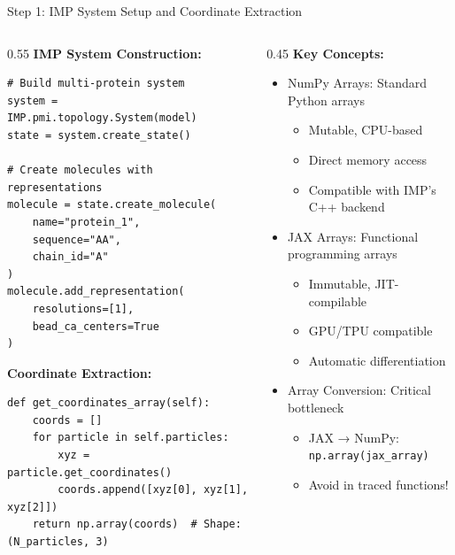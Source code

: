 \documentclass[aspectratio=169]{beamer}
\begin{document}
\begin{frame}[fragile]{Step 1: IMP System Setup and Coordinate Extraction}
\begin{columns}[T]
\begin{column}{0.55\textwidth}
\textbf{IMP System Construction:}
\begin{lstlisting}
# Build multi-protein system
system = IMP.pmi.topology.System(model)
state = system.create_state()

# Create molecules with representations
molecule = state.create_molecule(
    name="protein_1", 
    sequence="AA",
    chain_id="A"
)
molecule.add_representation(
    resolutions=[1], 
    bead_ca_centers=True
)
\end{lstlisting}

\textbf{Coordinate Extraction:}
\begin{lstlisting}
def get_coordinates_array(self):
    coords = []
    for particle in self.particles:
        xyz = particle.get_coordinates()
        coords.append([xyz[0], xyz[1], xyz[2]])
    return np.array(coords)  # Shape: (N_particles, 3)
\end{lstlisting}
\end{column}

\begin{column}{0.45\textwidth}
\textbf{Key Concepts:}
\begin{itemize}
    \item \alert{NumPy Arrays}: Standard Python arrays
    \begin{itemize}
        \item Mutable, CPU-based
        \item Direct memory access
        \item Compatible with IMP's C++ backend
    \end{itemize}
    
    \vspace{0.3cm}
    \item \alert{JAX Arrays}: Functional programming arrays
    \begin{itemize}
        \item Immutable, JIT-compilable
        \item GPU/TPU compatible
        \item Automatic differentiation
    \end{itemize}
    
    \vspace{0.3cm}
    \item \alert{Array Conversion}: Critical bottleneck
    \begin{itemize}
        \item JAX → NumPy: \texttt{np.array(jax\_array)}
        \item Avoid in traced functions!
    \end{itemize}
\end{itemize}
\end{column}
\end{columns}
\end{frame}
\end{document}
